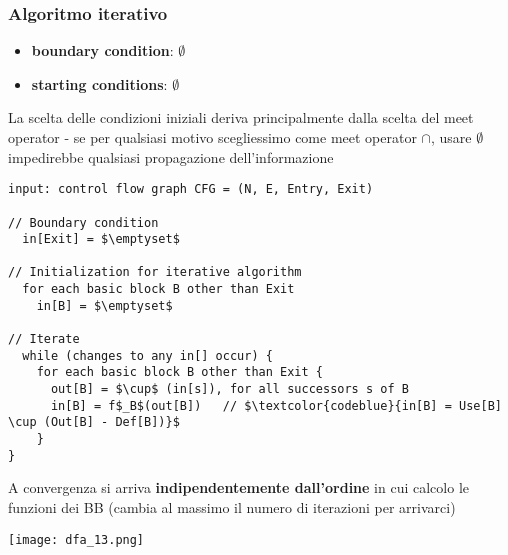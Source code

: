 \subsubsection{Algoritmo iterativo}

\noindent\begin{minipage}[c]{.3\textwidth}
\begin{itemize}
  \item \textbf{boundary condition}: $\emptyset$
  \item \textbf{starting conditions}: $\emptyset$
\end{itemize}
\end{minipage}\hfill
\begin{minipage}[c]{.67\textwidth}
\begin{emphasize}
  La scelta delle condizioni iniziali deriva principalmente dalla scelta del meet operator - se per qualsiasi motivo scegliessimo come meet operator $\cap$, usare $\emptyset$ impedirebbe qualsiasi propagazione dell'informazione
\end{emphasize}
\end{minipage}

\vspace{1em}
\begin{lstlisting}
input: control flow graph CFG = (N, E, Entry, Exit)

// Boundary condition
  in[Exit] = $\emptyset$

// Initialization for iterative algorithm
  for each basic block B other than Exit
    in[B] = $\emptyset$

// Iterate
  while (changes to any in[] occur) {
    for each basic block B other than Exit {
      out[B] = $\cup$ (in[s]), for all successors s of B
      in[B] = f$_B$(out[B])   // $\textcolor{codeblue}{in[B] = Use[B] \cup (Out[B] - Def[B])}$
    }
}\end{lstlisting}

\begin{emphasize}
  A convergenza si arriva \textbf{indipendentemente dall'ordine} in cui calcolo le funzioni dei BB (cambia al massimo il numero di iterazioni per arrivarci)
\end{emphasize}

\begin{example}
  \begin{center}
    \texttt{[image: dfa\_13.png]}
  \end{center}
\end{example}


